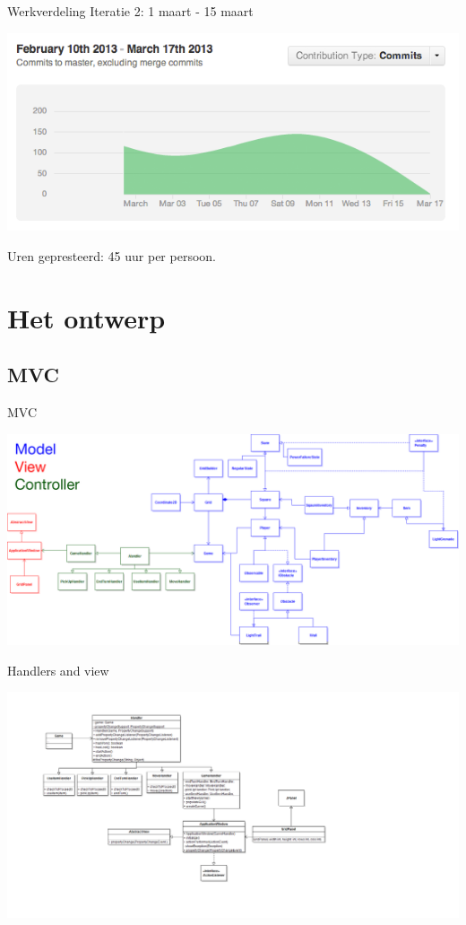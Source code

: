 \documentclass[t]{beamer}
\begin{document}
\begin{frame}{Werkverdeling}
Iteratie 2: 1 maart - 15 maart

\begin{center}
\includegraphics[width= 0.90\linewidth]{images/flowchart}
\end{center}

Uren gepresteerd: 45 uur per persoon.

\end{frame}
\section{Het ontwerp}
\subsection{MVC}

\begin{frame}{MVC}
\begin{center}
\includegraphics[width=0.90\linewidth]{images/MVC-overview3}
\end{center}
\end{frame}

\begin{frame}{Handlers and view}
\begin{center}
\includegraphics[width=\linewidth]{images/Handlers-View}
\end{center}
\end{frame}
\end{document}

